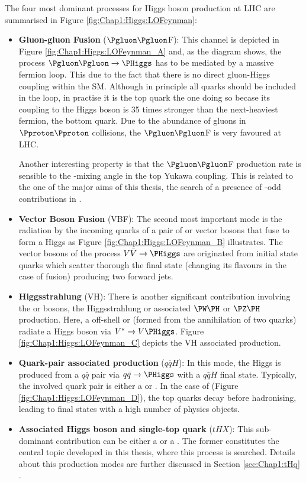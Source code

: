 The four most dominant processes for Higgs boson production at LHC are summarised in Figure \ref{fig:Chap1:Higgs:LOFeynman}:
\begin{itemize}
  \item \textbf{Gluon-gluon Fusion} ($\Pgluon \Pgluon$F): 
				This channel is depicted in Figure \ref{fig:Chap1:Higgs:LOFeynman_A} and, as the diagram shows, the process 
				$\Pgluon \Pgluon \rightarrow \PHiggs$ has to be mediated by a massive fermion loop. This due to the fact that
				there is no direct gluon-Higgs coupling within the SM.  Although in principle all quarks should be included in the
				loop, in practise it is the top quark the one doing so becase its coupling to the Higgs boson is 35 times stronger
				than the next-heaviest fermion, the bottom quark.
				Due to the abundance of gluons in $\Pproton \Pproton$ collisions, the $\Pgluon \Pgluon$F is very favoured at LHC.
				
				Another interesting property is that the $\Pgluon \Pgluon$F production rate is sensible to the \CP-mixing angle in 
				the top Yukawa coupling. This is related to the one of the major aims of this thesis, the search of a presence of
				\CP-odd contributions in \yt.
				
							
  \item \textbf{Vector Boson Fusion} (VBF): 
  				The second most important mode is the radiation by the incoming quarks of a pair of
				\PW or  \PZ vector bosons that fuse to 
  				form a Higgs as Figure \ref{fig:Chap1:Higgs:LOFeynman_B} illustrates. The vector bosons of
				the process $V\bar{V}\rightarrow \PHiggs$ are originated from initial state quarks which scatter
				thorough the final state (changing its flavours in the case of \PW fusion) producing two forward jets.
				
  \item \textbf{Higgsstrahlung} (VH): 
  				There is another significant contribution involving the \PW or \PZ bosons, the Higgsstrahlung or associated 
				$\PW\PH$ or $\PZ\PH$ production. Here, a off-shell \PW or \PZ (formed from the annihilation of two 
				quarks) radiate a Higgs boson via $V^{*} \rightarrow V\PHiggs$. 
				Figure \ref{fig:Chap1:Higgs:LOFeynman_C} depicts the VH associated production.
  \item \textbf{Quark-pair associated production} ($q\bar{q}H$): 
  				In this mode, the Higgs is produced from a $q\bar{q}$ pair via $q\bar{q}\rightarrow \PHiggs$ with a $q\bar{q}H$
				final state. Typically, the involved quark pair is either a \bbbar or \ttbar. In the case of \ttbar 
				(Figure \ref{fig:Chap1:Higgs:LOFeynman_D}), the top quarks decay before hadronising, leading
				to final states with a high number of physics objects.
  \item \textbf{Associated Higgs boson and single-top quark} ($tHX$): 
  				This sub-dominant contribution can be either a \tHq or a \tWH. The former constitutes the central topic 
				developed in this thesis, where this process is searched. Details about this production modes are further
				discussed in Section \ref{sec:Chap1:tHq} .
  
\end{itemize}
  



